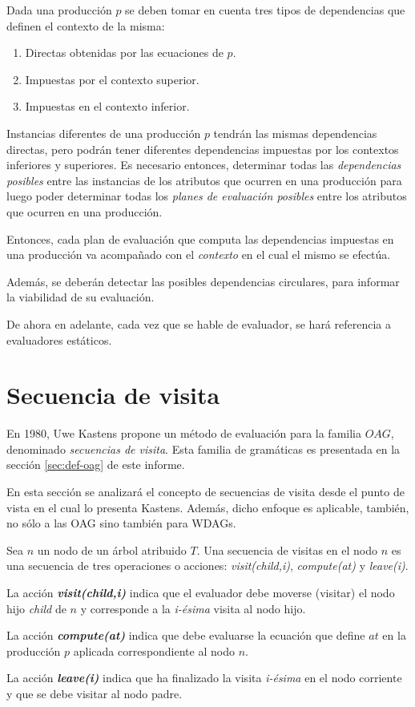 Dada una producción $p$ se deben tomar en cuenta tres tipos de dependencias que definen el contexto de la misma:
\begin{enumerate}
\item Directas obtenidas por las ecuaciones de $p$.
\item Impuestas por el contexto superior.
\item Impuestas en el contexto inferior.
\end{enumerate}

Instancias diferentes de una producción $p$ tendrán las mismas dependencias directas, pero podrán tener diferentes dependencias impuestas por los contextos inferiores y superiores. Es necesario entonces, determinar todas las \emph{dependencias posibles} entre las instancias de los atributos que ocurren en una producción para luego poder determinar todas los \emph{planes de evaluación posibles} entre los atributos que ocurren en una producción.

Entonces, cada plan de evaluación que computa las dependencias impuestas en una producción va acompañado con el \textit{contexto} en el cual el mismo se efectúa.

Además, se deberán detectar las posibles dependencias circulares, para informar la viabilidad de su evaluación.

De ahora en adelante, cada vez que se hable de evaluador, se hará referencia a evaluadores estáticos.

\section{Secuencia de visita}
\label{sec:sec-visit}
En 1980, Uwe Kastens propone un método de evaluación para la familia $OAG$, denominado \emph{secuencias de visita}\cite{kastens}. Esta familia de gramáticas es presentada en la sección \ref{sec:def-oag} de este informe.

En esta sección se analizará el concepto de secuencias de visita desde el punto de vista en el cual lo presenta Kastens. Además, dicho enfoque es aplicable, también, no sólo a las OAG sino también para WDAGs.

Sea $n$ un nodo de un árbol atribuido $T$. 
Una secuencia de visitas en el nodo $n$ es una secuencia de tres operaciones o acciones: 
\emph{visit(child,i)}, \emph{compute(at)} y \emph{leave(i)}.

\begin{description}
\item La acción \emph{\textbf{visit(child,i)}} indica que el evaluador debe moverse (visitar) el nodo hijo \emph{child} de $n$ y corresponde a la \emph{i-ésima} visita al nodo hijo.

\item La acción \emph{\textbf{compute(at)}} indica que debe evaluarse la ecuación que define $at$ en la producción $p$ aplicada correspondiente al nodo $n$.

\item La acción \emph{\textbf{leave(i)}} indica que ha finalizado la visita \emph{i-ésima} en el nodo corriente y que se debe visitar al nodo padre.
\end{description}

